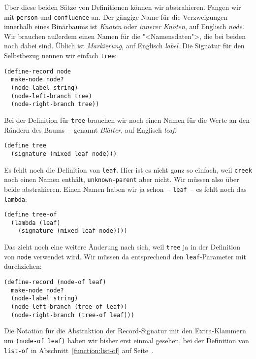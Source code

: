 Über diese beiden Sätze von Definitionen können wir abstrahieren.
Fangen wir mit \lstinline{person} und \lstinline{confluence} an.  Der
gängige Name für die Verzweigungen innerhalb eines Binärbaums ist
\textit{Knoten} oder \textit{innerer Knoten}, auf
Englisch \textit{node}.  Wir brauchen außerdem einen Namen für die
"<Namensdaten">, die bei beiden noch dabei sind.  Üblich ist
\textit{Markierung}, auf Englisch \textit{label}.
Die Signatur für den Selbstbezug nennen wir einfach \lstinline{tree}:
%
\begin{lstlisting}
(define-record node
  make-node node?
  (node-label string)
  (node-left-branch tree)
  (node-right-branch tree))
\end{lstlisting}
%
Bei der Definition für \lstinline{tree} brauchen wir noch einen Namen
für die Werte an den Rändern des Baums~-- genannt
\textit{Blätter}, auf Englisch \textit{leaf}.
%
\begin{lstlisting}
(define tree
  (signature (mixed leaf node)))
\end{lstlisting}
%
Es fehlt noch die Definition von \lstinline{leaf}.  Hier ist es nicht
ganz so einfach, weil \lstinline{creek} noch einen Namen enthält,
\lstinline{unknown-parent} aber nicht.  Wir müssen also über beide
abstrahieren.  Einen Namen haben wir ja schon~-- \lstinline{leaf}~--
es fehlt noch das \lstinline{lambda}:
%
\begin{lstlisting}
(define tree-of
  (lambda (leaf)
    (signature (mixed leaf node))))
\end{lstlisting}
%
Das zieht noch eine weitere Änderung nach sich, weil \lstinline{tree}
ja in der Definition von \lstinline{node} verwendet wird.  Wir müssen
da entsprechend den \lstinline{leaf}-Parameter mit durchziehen:
%
\begin{lstlisting}
(define-record (node-of leaf)
  make-node node?
  (node-label string)
  (node-left-branch (tree-of leaf))
  (node-right-branch (tree-of leaf)))
\end{lstlisting}
%
Die Notation für die Abstraktion der Record-Signatur mit den
Extra-Klammern um \lstinline{(node-of leaf)} haben wir bisher erst
einmal gesehen, bei der Definition von \lstinline{list-of} in
Abschnitt~\ref{function:list-of} auf Seite~\pageref{function:list-of}.

